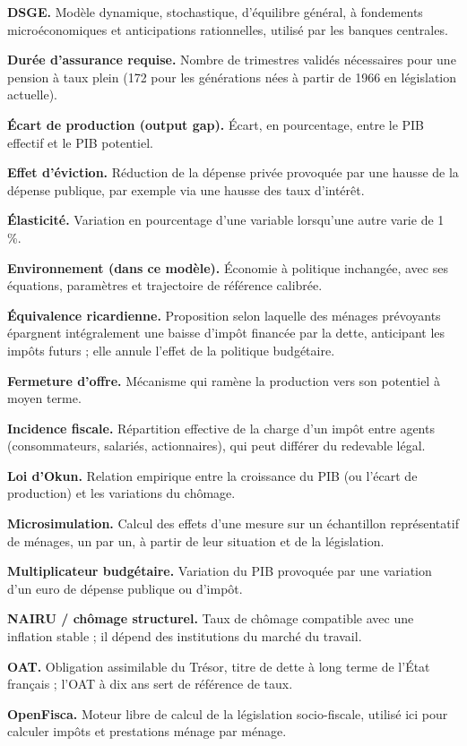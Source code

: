 \documentclass[
  11pt,
  11pt,
  a4paper,
  openany]{book}
\begin{document}
\textbf{DSGE.} Modèle dynamique, stochastique, d'équilibre général, à
fondements microéconomiques et anticipations rationnelles, utilisé par
les banques centrales.

\textbf{Durée d'assurance requise.} Nombre de trimestres validés
nécessaires pour une pension à taux plein (172 pour les générations nées
à partir de 1966 en législation actuelle).

\textbf{Écart de production (output gap).} Écart, en pourcentage, entre
le PIB effectif et le PIB potentiel.

\textbf{Effet d'éviction.} Réduction de la dépense privée provoquée par
une hausse de la dépense publique, par exemple via une hausse des taux
d'intérêt.

\textbf{Élasticité.} Variation en pourcentage d'une variable lorsqu'une
autre varie de 1 \%.

\textbf{Environnement (dans ce modèle).} Économie à politique inchangée,
avec ses équations, paramètres et trajectoire de référence calibrée.

\textbf{Équivalence ricardienne.} Proposition selon laquelle des ménages
prévoyants épargnent intégralement une baisse d'impôt financée par la
dette, anticipant les impôts futurs ; elle annule l'effet de la
politique budgétaire.

\textbf{Fermeture d'offre.} Mécanisme qui ramène la production vers son
potentiel à moyen terme.

\textbf{Incidence fiscale.} Répartition effective de la charge d'un
impôt entre agents (consommateurs, salariés, actionnaires), qui peut
différer du redevable légal.

\textbf{Loi d'Okun.} Relation empirique entre la croissance du PIB (ou
l'écart de production) et les variations du chômage.

\textbf{Microsimulation.} Calcul des effets d'une mesure sur un
échantillon représentatif de ménages, un par un, à partir de leur
situation et de la législation.

\textbf{Multiplicateur budgétaire.} Variation du PIB provoquée par une
variation d'un euro de dépense publique ou d'impôt.

\textbf{NAIRU / chômage structurel.} Taux de chômage compatible avec une
inflation stable ; il dépend des institutions du marché du travail.

\textbf{OAT.} Obligation assimilable du Trésor, titre de dette à long
terme de l'État français ; l'OAT à dix ans sert de référence de taux.

\textbf{OpenFisca.} Moteur libre de calcul de la législation
socio-fiscale, utilisé ici pour calculer impôts et prestations ménage
par ménage.
\end{document}
